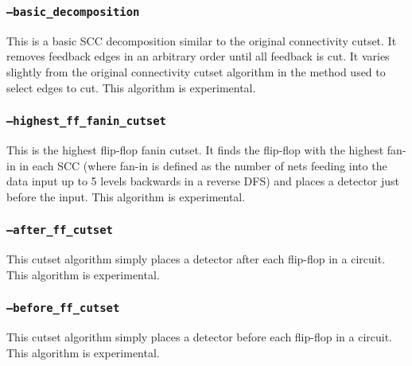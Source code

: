 \subsubsection{\texttt{--basic\_decomposition}}
This is a basic SCC decomposition similar to the original connectivity cutset.
It removes feedback edges in an arbitrary order until all feedback is cut. It
varies slightly from the original connectivity cutset algorithm in the method
used to select edges to cut. This algorithm is experimental.

\subsubsection{\texttt{--highest\_ff\_fanin\_cutset}}
This is the highest flip-flop fanin cutset. It finds the flip-flop with the
highest fan-in in each SCC (where fan-in is defined as the number of nets
feeding into the data input up to 5 levels backwards in a reverse DFS) and
places a detector just before the input. This algorithm is experimental.

\subsubsection{\texttt{--after\_ff\_cutset}}
This cutset algorithm simply places a detector after each flip-flop in a
circuit. This algorithm is experimental.

\subsubsection{\texttt{--before\_ff\_cutset}}
This cutset algorithm simply places a detector before each flip-flop in a
circuit. This algorithm is experimental.




